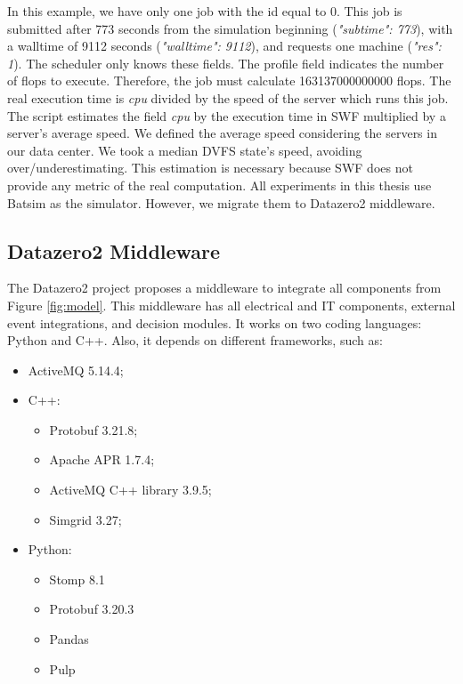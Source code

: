 In this example, we have only one job with the id equal to 0. This job is submitted after 773 seconds from the simulation beginning (\textit{"subtime": 773}), with a walltime of 9112 seconds (\textit{"walltime": 9112}), and requests one machine (\textit{"res": 1}). The scheduler only knows these fields. The profile field indicates the number of flops to execute. Therefore, the job must calculate 163137000000000 flops. The real execution time is \textit{cpu} divided by the speed of the server which runs this job. The script estimates the field \textit{cpu} by the execution time in SWF multiplied by a server's average speed. We defined the average speed considering the servers in our data center. We took a median DVFS state's speed, avoiding over/underestimating. This estimation is necessary because SWF does not provide any metric of the real computation. All experiments in this thesis use Batsim as the simulator. However, we migrate them to Datazero2 middleware.

\subsection{Datazero2 Middleware}

The Datazero2 project proposes a middleware to integrate all components from Figure \ref{fig:model}. This middleware has all electrical and IT components, external event integrations, and decision modules. It works on two coding languages: Python and C++. Also, it depends on different frameworks, such as:
\begin{itemize}
    \item ActiveMQ 5.14.4;
    \item C++:
    \begin{itemize}
        \item Protobuf 3.21.8;
        \item Apache APR 1.7.4;
        \item ActiveMQ C++ library 3.9.5;
        \item Simgrid 3.27;
    \end{itemize}
    \item Python:
    \begin{itemize}
        \item Stomp 8.1
        \item Protobuf 3.20.3
        \item Pandas
        \item Pulp
    \end{itemize}
\end{itemize}

